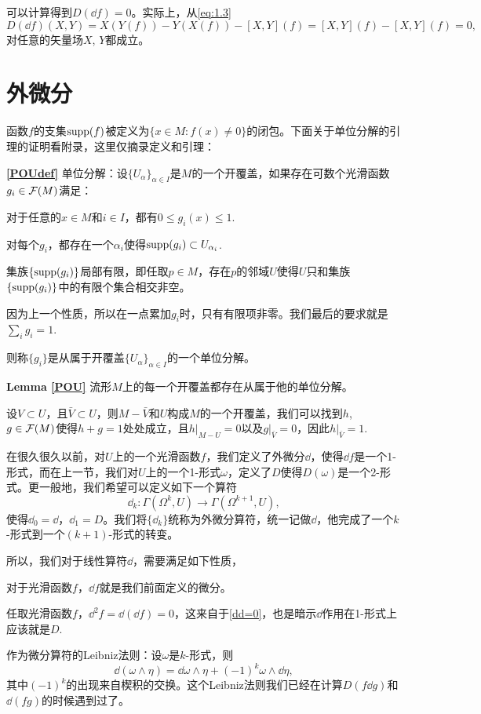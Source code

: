 \para \label{dd=0}可以计算得到$D(\dd f)=0$。实际上，从\eqref{eq:1.3}
\[
	D(\dd f)(X,Y)=X(Y(f))-Y(X(f))-[X,Y](f)=[X,Y](f)-[X,Y](f)=0,
\]
对任意的矢量场$X$, $Y$都成立。

\section{外微分}

函数$f$的支集$\operatorname{supp}(f)$被定义为$\{x\in M:f(x)\neq 0\}$的闭包。下面关于单位分解的引理的证明看附录，这里仅摘录定义和引理：

\textbf{\eqref{POUdef}} 单位分解：设$\{U_\alpha\}_{\alpha\in I}$是$M$的一个开覆盖，如果存在可数个光滑函数$g_i\in \mathcal{F}(M)$满足：

 对于任意的$x\in M$和$i\in I$，都有$0\leq g_i(x)\leq 1$.

 对每个$g_i$，都存在一个${\alpha_i}$使得$\operatorname{supp}(g_i)\subset U_{\alpha_i}$.

 集族$\{\operatorname{supp}(g_i)\}$局部有限，即任取$p\in M$，存在$p$的邻域$U$使得$U$只和集族$\{\operatorname{supp}(g_i)\}$中的有限个集合相交非空。

 因为上一个性质，所以在一点累加$g_i$时，只有有限项非零。我们最后的要求就是$\sum_i g_i=1$.

则称$\{g_i\}$是从属于开覆盖$\{U_\alpha\}_{\alpha\in I}$的一个单位分解。

\textbf{Lemma \ref{POU}} 流形$M$上的每一个开覆盖都存在从属于他的单位分解。

\para \label{unit} 设$V\subset U$，且$\bar{V}\subset U$，则$M-\bar{V}$和$U$构成$M$的一个开覆盖，我们可以找到$h$, $g\in \mathcal{F}(M)$使得$h+g=1$处处成立，且$h|_{M-U}=0$以及$g|_{\bar{V}}=0$，因此$h|_{\bar{V}}=1$.

\para 在很久很久以前，对$U$上的一个光滑函数$f$，我们定义了外微分$\dd$，使得$\dd f$是一个1-形式，而在上一节，我们对$U$上的一个1-形式$\omega$，定义了$D$使得$D(\omega)$是一个2-形式。更一般地，我们希望可以定义如下一个算符
\[
	\dd_k:\Gamma(\Omega^k,U)\to \Gamma(\Omega^{k+1},U),
\]
使得$\dd_0=\dd$，$\dd_1=D$。我们将$\{\dd_k\}$统称为外微分算符，统一记做$\dd$，他完成了一个$k$-形式到一个$(k+1)$-形式的转变。

所以，我们对于线性算符$\dd$，需要满足如下性质，

 对于光滑函数$f$，$\dd f$就是我们前面定义的微分。

 任取光滑函数$f$，$\dd^2 f=\dd (\dd f)=0$，这来自于\eqref{dd=0}，也是暗示$\dd$作用在1-形式上应该就是$D$.

 作为微分算符的Leibniz法则：设$\omega$是$k$-形式，则
\[
	\dd(\omega\wedge \eta)=\dd \omega \wedge \eta +(-1)^k \omega\wedge \dd\eta,
\]
其中$(-1)^k$的出现来自楔积的交换。这个Leibniz法则我们已经在计算$D(f\dd g)$和$\dd(fg)$的时候遇到过了。

